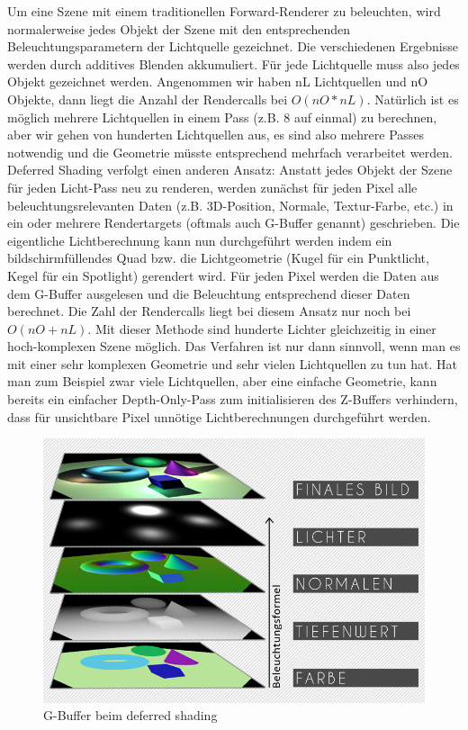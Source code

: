 Um eine Szene mit einem traditionellen Forward-Renderer zu beleuchten, wird normalerweise jedes Objekt der Szene mit den entsprechenden Beleuchtungsparametern der Lichtquelle gezeichnet. Die verschiedenen Ergebnisse werden durch additives Blenden akkumuliert. Für jede Lichtquelle muss also jedes Objekt gezeichnet werden. Angenommen wir haben nL Lichtquellen und nO Objekte, dann liegt die Anzahl der Rendercalls bei $O(nO * nL)$. Natürlich ist es möglich mehrere Lichtquellen in einem Pass (z.B. 8 auf einmal) zu berechnen, aber wir gehen von hunderten Lichtquellen aus, es sind also mehrere Passes notwendig und die Geometrie müsste entsprechend mehrfach verarbeitet werden.
Deferred Shading verfolgt einen anderen Ansatz: Anstatt jedes Objekt der Szene für jeden Licht-Pass neu zu renderen, werden zunächst für jeden Pixel alle beleuchtungsrelevanten Daten (z.B. 3D-Position, Normale, Textur-Farbe, etc.) in ein oder mehrere Rendertargets (oftmals auch G-Buffer genannt) geschrieben. Die eigentliche Lichtberechnung kann nun durchgeführt werden indem ein bildschirmfüllendes Quad bzw. die Lichtgeometrie (Kugel für ein Punktlicht, Kegel für ein Spotlight) gerendert wird. Für jeden Pixel werden die Daten aus dem G-Buffer ausgelesen und die Beleuchtung entsprechend dieser Daten berechnet. Die Zahl der Rendercalls liegt bei diesem Ansatz nur noch bei $O(nO + nL)$. Mit dieser Methode sind hunderte Lichter gleichzeitig in einer hoch-komplexen Szene möglich.
Das Verfahren ist nur dann sinnvoll, wenn man es mit einer sehr komplexen Geometrie und sehr vielen Lichtquellen zu tun hat. Hat man zum Beispiel zwar viele Lichtquellen, aber eine einfache Geometrie, kann bereits ein einfacher Depth-Only-Pass zum initialisieren des Z-Buffers verhindern, dass für unsichtbare Pixel unnötige Lichtberechnungen durchgeführt werden.

\begin{figure}[H]
    \centering
    \includegraphics[width=1.0\textwidth]{images/deffered_shading.jpg}
    \caption{G-Buffer beim deferred shading} %
    \label{fig:defferedshading}
\end{figure}

